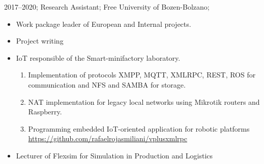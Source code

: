 \addwork%
{%
    2017--2020;%
    Research Assistant;%
    Free University of Bozen-Bolzano;%
    \begin{itemize}
        \item Work package leader of European and Internal projects.
        \item Project writing
        \item IoT responsible of the Smart-minifactory laboratory.
            \ifdefined\extended
                \begin{enumerate}
                    \item Implementation of protocols XMPP, MQTT, XMLRPC, REST, ROS for communication and NFS and SAMBA for storage.
                    \item NAT implementation for legacy local networks using Mikrotik routers and Raspberry.
                    \item Programming embedded IoT-oriented application for robotic platforms \href{https://github.com/rafaelrojasmiliani/vplusxmlrpc}{https://github.com/rafaelrojasmiliani/vplusxmlrpc}
                \end{enumerate}
            \fi
        \item Lecturer of Flexsim for Simulation in Production and Logistics
    \end{itemize}
}%
%
